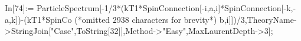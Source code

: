 In[74]:= ParticleSpectrum[-1/3*(kT1*SpinConnection[-i,a,i]*SpinConnection[-k,-a,k])-(kT1*SpinCo (*omitted 2938 characters for brevity*) b,i]])/3,TheoryName->StringJoin["Case",ToString[32]],Method->"Easy",MaxLaurentDepth->3];